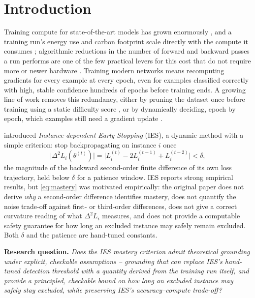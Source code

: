 \documentclass{article}
\theoremstyle{plain}
\theoremstyle{definition}
\theoremstyle{remark}
\begin{document}
\section{Introduction}
\label{sec:intro}

Training compute for state-of-the-art models has grown enormously \citep{sevilla2022compute}, and a training run's energy use and carbon footprint scale directly with the compute it consumes \citep{patterson2022carbon}; algorithmic reductions in the number of forward and backward passes a run performs are one of the few practical levers for this cost that do not require more or newer hardware \citep{bartoldson2023computeefficient}. Training modern networks means recomputing gradients for every example at every epoch, even for examples classified correctly with high, stable confidence hundreds of epochs before training ends. A growing line of work removes this redundancy, either by pruning the dataset once before training using a static difficulty score \citep{toneva2019empirical,paul2021deep,swayamdipta2020dataset,sorscher2022beyond,zheng2023coverage,maharana2024d2}, or by dynamically deciding, epoch by epoch, which examples still need a gradient update \citep{loshchilov2015online,katharopoulos2018not,jiang2019accelerating,qin2024infobatch,mindermann2022prioritized,bankes2024reducr,nagaraj2025coresets,jin2026orderdp}.

\citet{yuan2025instance} introduced \emph{Instance-dependent Early Stopping} (IES), a dynamic method with a simple criterion: stop backpropagating on instance $i$ once
\begin{equation}
\label{eq:mastery}
\big|\Delta^2 L_i(\theta^{(t)})\big| = \big|L_i^{(t)} - 2L_i^{(t-1)} + L_i^{(t-2)}\big| < \delta,
\end{equation}
the magnitude of the backward second-order finite difference of its own loss trajectory, held below $\delta$ for a patience window. IES reports strong empirical results, but \cref{eq:mastery} was motivated empirically: the original paper does not derive \emph{why} a second-order difference identifies mastery, does not quantify the noise trade-off against first- or third-order differences, does not give a correct curvature reading of what $\Delta^2 L_i$ measures, and does not provide a computable safety guarantee for how long an excluded instance may safely remain excluded. Both $\delta$ and the patience are hand-tuned constants.

\textbf{Research question.} \emph{Does the IES mastery criterion admit theoretical grounding under explicit, checkable assumptions -- grounding that can replace IES's hand-tuned detection threshold with a quantity derived from the training run itself, and provide a principled, checkable bound on how long an excluded instance may safely stay excluded, while preserving IES's accuracy--compute trade-off?}
\end{document}

